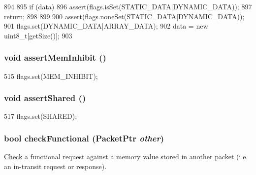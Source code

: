 \begin{DoxyCode}
894     {
895         if (data) {
896             assert(flags.isSet(STATIC_DATA|DYNAMIC_DATA));
897             return;
898         }
899 
900         assert(flags.noneSet(STATIC_DATA|DYNAMIC_DATA));
901         flags.set(DYNAMIC_DATA|ARRAY_DATA);
902         data = new uint8_t[getSize()];
903     }
\end{DoxyCode}
\hypertarget{classPacket_a159497b4ab2144a0c1c36d2266df17d1}{
\subsubsection[{assertMemInhibit}]{\setlength{\rightskip}{0pt plus 5cm}void assertMemInhibit ()}}
\label{classPacket_a159497b4ab2144a0c1c36d2266df17d1}



\begin{DoxyCode}
515 { flags.set(MEM_INHIBIT); }
\end{DoxyCode}
\hypertarget{classPacket_a40d9a7952a041e62ac388a0f523dee41}{
\subsubsection[{assertShared}]{\setlength{\rightskip}{0pt plus 5cm}void assertShared ()}}
\label{classPacket_a40d9a7952a041e62ac388a0f523dee41}



\begin{DoxyCode}
517 { flags.set(SHARED); }
\end{DoxyCode}
\hypertarget{classPacket_ab27966f94fe8860e3845815fd4b8da7f}{
\subsubsection[{checkFunctional}]{\setlength{\rightskip}{0pt plus 5cm}bool checkFunctional ({\bf PacketPtr} {\em other})}}
\label{classPacket_ab27966f94fe8860e3845815fd4b8da7f}
\hyperlink{classCheck}{Check} a functional request against a memory value stored in another packet (i.e. an in-\/transit request or response). 


